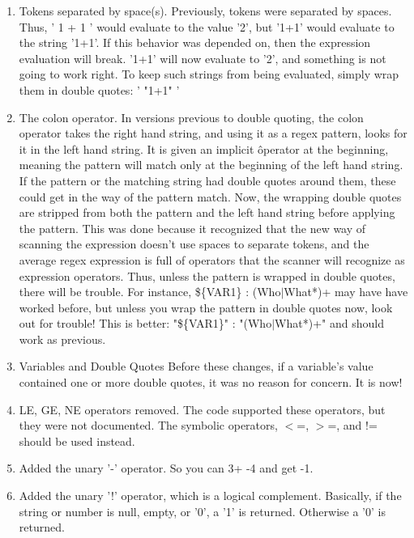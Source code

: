 \begin{enumerate}
\item Tokens separated by space(s).
   Previously, tokens were separated by spaces. Thus, ' 1 + 1 ' would evaluate
   to the value '2', but '1+1' would evaluate to the string '1+1'. If this
   behavior was depended on, then the expression evaluation will break. '1+1'
   will now evaluate to '2', and something is not going to work right.
   To keep such strings from being evaluated, simply wrap them in double
   quotes: '  "1+1" '

\item The colon operator. In versions previous to double quoting, the
   colon operator takes the right hand string, and using it as a
   regex pattern, looks for it in the left hand string. It is given
   an implicit \^ operator at the beginning, meaning the pattern
   will match only at the beginning of the left hand string.
   If the pattern or the matching string had double quotes around
   them, these could get in the way of the pattern match. Now,
   the wrapping double quotes are stripped from both the pattern
   and the left hand string before applying the pattern. This
   was done because it recognized that the new way of
   scanning the expression doesn't use spaces to separate tokens,
   and the average regex expression is full of operators that
   the scanner will recognize as expression operators. Thus, unless
   the pattern is wrapped in double quotes, there will be trouble.
   For instance,      \$\{VAR1\} : (Who$|$What*)+
   may have have worked before, but unless you wrap the pattern
   in double quotes now, look out for trouble! This is better:
         "\$\{VAR1\}" : "(Who$|$What*)+"
   and should work as previous.

\item Variables and Double Quotes
   Before these changes, if a variable's value contained one or more double
   quotes, it was no reason for concern. It is now!

\item LE, GE, NE operators removed. The code supported these operators,
   but they were not documented. The symbolic operators, $<$=, $>$=, and !=
   should be used instead.

\item  Added the unary '-' operator. So you can 3+ -4 and get -1.

\item  Added the unary '!' operator, which is a logical complement.
    Basically, if the string or number is null, empty, or '0',
    a '1' is returned. Otherwise a '0' is returned.


\end{enumerate}
